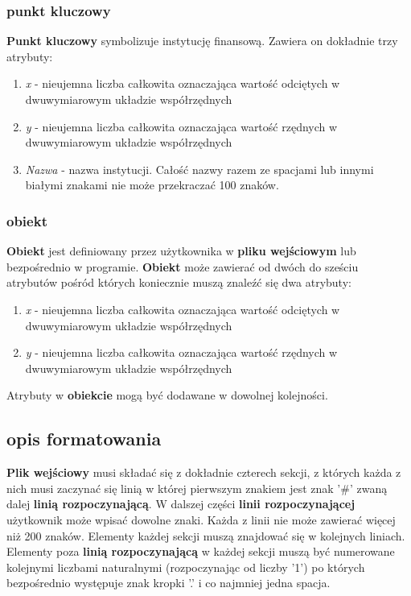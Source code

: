 \documentclass[hidelinks,10pt,a4paper]{article}
\begin{document}
\subsubsection{punkt kluczowy}
\textbf{Punkt kluczowy} symbolizuje instytucję finansową. 
Zawiera on dokładnie trzy atrybuty:
\begin{enumerate}
\item \textit{x} - nieujemna liczba całkowita oznaczająca wartość odciętych w dwuwymiarowym układzie współrzędnych
\item \textit{y} - nieujemna liczba całkowita oznaczająca wartość rzędnych w dwuwymiarowym układzie współrzędnych
\item \textit{Nazwa} - nazwa instytucji. Całość nazwy razem ze spacjami lub innymi białymi znakami nie może przekraczać 100 znaków. 
\end{enumerate}

\subsubsection{obiekt}
\textbf{Obiekt} jest definiowany przez użytkownika w \textbf{pliku wejściowym} lub bezpośrednio w programie. 
\textbf{Obiekt} może zawierać od dwóch do sześciu atrybutów pośród których koniecznie muszą znaleźć się dwa atrybuty:
\begin{enumerate}
\item \textit{x} - nieujemna liczba całkowita oznaczająca wartość odciętych w dwuwymiarowym układzie współrzędnych
\item \textit{y} - nieujemna liczba całkowita oznaczająca wartość rzędnych w dwuwymiarowym układzie współrzędnych
\end{enumerate}
Atrybuty w \textbf{obiekcie} mogą być dodawane w dowolnej kolejności.

\subsection{opis formatowania}

\textbf{Plik wejściowy} musi składać się z dokładnie czterech sekcji, z których każda z nich musi zaczynać się linią w której pierwszym znakiem jest znak '\#' zwaną dalej \textbf{linią rozpoczynającą}.
W dalszej części \textbf{linii rozpoczynającej} użytkownik może wpisać dowolne znaki.
Każda z linii nie może zawierać więcej niż 200 znaków.
Elementy każdej sekcji muszą znajdować się w kolejnych liniach. 
Elementy poza \textbf{linią rozpoczynającą} w każdej sekcji muszą być numerowane kolejnymi liczbami naturalnymi (rozpoczynając od liczby '1') po których bezpośrednio występuje znak kropki '.' i co najmniej jedna spacja.
 
\end{document}

